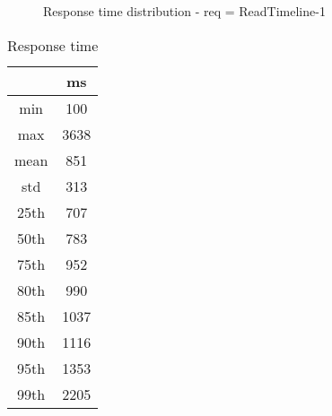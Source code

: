 \begin{minipage}{0.75\linewidth}
\begin{figure}[h]
\begin{adjustbox}{max width=1.0\linewidth, keepaspectratio}
  \end{adjustbox}
  \caption{Response time distribution - req = ReadTimeline-1}
\end{figure}
\end{minipage}\hfill\begin{minipage}{0.18\linewidth}
\begin{table}[h]
\begin{tabular}{|cc|}
\hline
\textbf{} & \textbf{ms}\\ \hline
 \Xhline{0.005\arrayrulewidth}
min & 100\\
 \Xhline{0.005\arrayrulewidth}
max & 3638\\
 \Xhline{0.005\arrayrulewidth}
mean & 851\\
 \Xhline{0.005\arrayrulewidth}
std & 313\\
\hline
\hline
 \Xhline{0.005\arrayrulewidth}
25th & 707\\
 \Xhline{0.005\arrayrulewidth}
50th & 783\\
 \Xhline{0.005\arrayrulewidth}
75th & 952\\
 \Xhline{0.005\arrayrulewidth}
80th & 990\\
 \Xhline{0.005\arrayrulewidth}
85th & 1037\\
 \Xhline{0.005\arrayrulewidth}
90th & 1116\\
 \Xhline{0.005\arrayrulewidth}
95th & 1353\\
 \Xhline{0.005\arrayrulewidth}
99th & 2205\\
\hline
\end{tabular}
\caption{Response time}
\end{table}
\end{minipage}\hfill
